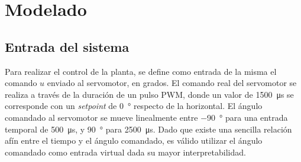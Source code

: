\section{Modelado}

\subsection{Entrada del sistema}


Para realizar el control de la planta, se define como entrada de la misma el comando $u$ enviado al servomotor, en grados. El comando real del servomotor se realiza a través de la duración de un pulso PWM, donde un valor de \qty{1500}{\us} se corresponde con un \emph{setpoint} de \qty{0}{\degree} respecto de la horizontal. El ángulo comandado al servomotor se mueve linealmente entre \qty{-90}{\degree} para una entrada temporal de \qty{500}{\us}, y \qty{90}{\degree} para \qty{2500}{\us}. Dado que existe una sencilla relación afín entre el tiempo y el ángulo comandado, es válido utilizar el ángulo comandado como entrada virtual dada su mayor interpretabilidad.


